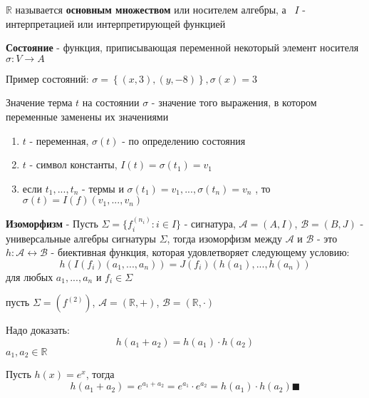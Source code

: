 \documentclass[../main/document.tex]{subfiles}
\begin{document}
\begin{dfn}
$\mathbb{R}$ называется \textbf{основным множеством} или носителем алгебры, а \
$I$ - интерпретацией или интерпретирующей функцией
\end{dfn}

\begin{dfn}[Состояние]
\textbf{Состояние} - функция, приписывающая переменной некоторый элемент носителя $\sigma :V\rightarrow A$
\end{dfn}

\begin{exm}
Пример состояний: $\sigma = \left\{(x,3),(y,-8)\right\}, \sigma(x)=3$
\end{exm}

\begin{dfn}
Значение терма $t$ на состоянии $\sigma$ - значение того выражения, в котором переменные заменены их значениями

\begin{enumerate}
\item $t$ - переменная, $\sigma(t)$ - по определению состояния
\item $t$ - символ константы, $I(t)=\sigma(t_1)=v_1$
\item если $t_1,...,t_n$ - термы и $\sigma(t_1)=v_1,...,\sigma(t_n)=v_n$ , то $\sigma(t)=I(f)(v_1,...,v_n)$
\end{enumerate}
\end{dfn}
\begin{dfn}[Изоморфизм]
\textbf{Изоморфизм} - Пусть $\Sigma=\{f_i^{(n_i)}:i\in I\}$ - сигнатура, $\mathcal{A}=(A,I)$, $\mathcal{B}=(B,J)$ - универсальные алгебры сигнатуры $\Sigma$, тогда изоморфизм между $\mathcal{A}$ и $\mathcal{B}$ - это $h:\mathcal{A}\leftrightarrow \mathcal{B}$ - биективная функция, которая удовлетворяет следующему условию:
$$h(I(f_i)(a_1,...,a_n))=J(f_i)(h(a_1),...,h(a_n))$$
для любых $a_1,...,a_n$ и $f_i\in \Sigma$
\end{dfn}

\begin{exm}
пусть $\Sigma=(f^{(2)})$, $\mathcal{A}=(\mathbb{R},+)$, $\mathcal{B}=(\mathbb{R},\cdot)$

Надо доказать: 
$$h(a_1+a_2)=h(a_1)\cdot h(a_2)$$
$a_1,a_2\in \mathbb{R}$

Пусть $h(x)=e^x$, тогда
$$h(a_1+a_2)=e^{a_1+a_2}=e^{a_1}\cdot e^{a_2}=h(a_1)\cdot h(a_2)\blacksquare$$
\end{exm}
\end{document}
